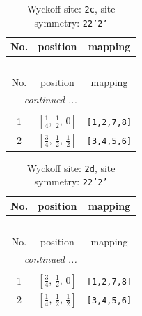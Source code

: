 \documentclass[fleqn,8pt]{jsarticle}
\begin{document}
\renewcommand{\arraystretch}{1.2}
\begin{longtable}{ccc}
\caption{Wyckoff site: {\tt 2c}, site symmetry: {\tt 22'2'}}
 \\
 \hline \hline
No. & position & mapping \\ \hline \endfirsthead

\multicolumn{2}{l}{\tablename\ \thetable{}} \\
 \hline \hline
No. & position & mapping \\ \hline \endhead

 \hline \hline
\multicolumn{2}{r}{\footnotesize\it continued ...} \\ \endfoot

 \hline \hline
\multicolumn{2}{r}{} \\ \endlastfoot

1 & $\left[ \frac{1}{4},\, \frac{1}{2},\, 0 \right]$ & {\tt [1,2,7,8]} \\ \hline
2 & $\left[ \frac{3}{4},\, \frac{1}{2},\, \frac{1}{2} \right]$ & {\tt [3,4,5,6]} \\
\end{longtable}
\renewcommand{\arraystretch}{1.2}
\begin{longtable}{ccc}
\caption{Wyckoff site: {\tt 2d}, site symmetry: {\tt 22'2'}}
 \\
 \hline \hline
No. & position & mapping \\ \hline \endfirsthead

\multicolumn{2}{l}{\tablename\ \thetable{}} \\
 \hline \hline
No. & position & mapping \\ \hline \endhead

 \hline \hline
\multicolumn{2}{r}{\footnotesize\it continued ...} \\ \endfoot

 \hline \hline
\multicolumn{2}{r}{} \\ \endlastfoot

1 & $\left[ \frac{3}{4},\, \frac{1}{2},\, 0 \right]$ & {\tt [1,2,7,8]} \\ \hline
2 & $\left[ \frac{1}{4},\, \frac{1}{2},\, \frac{1}{2} \right]$ & {\tt [3,4,5,6]} \\
\end{longtable}
\renewcommand{\arraystretch}{1.2}
\end{document}
